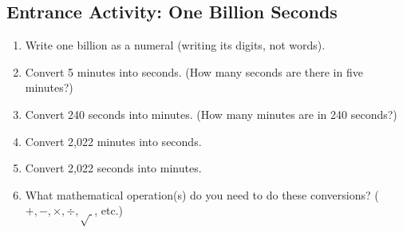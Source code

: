 \subsection{Entrance Activity: One Billion Seconds}
\begin{enumerate}
	\item Write one billion as a numeral (writing its digits, not words). \wbvfill
	\item Convert 5 minutes into seconds. (How many seconds are there in five minutes?) \wbvfill
	\item Convert 240 seconds into minutes. (How many minutes are in 240 seconds?) \wbvfill
	\item Convert 2,022 minutes into seconds. \wbvfill
	\item Convert 2,022 seconds into minutes. \wbvfill
	\item What mathematical operation(s) do you need to do these conversions? ($+,-,\times,\div,\sqrt{\ }$, etc.) \wbvfill
\end{enumerate}

\wbnewpage

